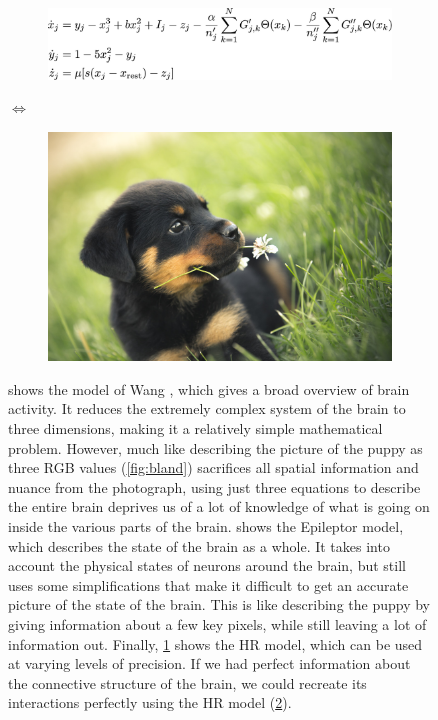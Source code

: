 \begin{figure}[ht]
  \begin{subfigure}[c]{0.4\textwidth}
    \includegraphics[width=\textwidth]{figure/HR}
    \caption{}
    \label{fig:HR}
  \end{subfigure} $\iff$
  \begin{subfigure}[c]{0.4\textwidth}
    \includegraphics[width=\textwidth]{figure/puppy}
    \caption{}
    \label{fig:puppy}
  \end{subfigure}
  \caption{ shows the model of Wang \etal, which gives a broad overview of brain activity.
  It reduces the extremely complex system of the brain to three dimensions, making it a relatively simple mathematical problem.
  However, much like describing the picture of the puppy as three RGB values (\cref{fig:bland}) sacrifices all spatial information and nuance from the photograph, using just three equations to describe the entire brain deprives us of a lot of knowledge of what is going on inside the various parts of the brain.
   shows the Epileptor model, which describes the state of the brain as a whole.
  It takes into account the physical states of neurons around the brain, but still uses some simplifications that make it difficult to get an accurate picture of the state of the brain.
  This is like describing the puppy by giving information about a few key pixels, while still leaving a lot of information out.
  Finally, \cref{fig:HR} shows the HR model, which can be used at varying levels of precision.
  If we had perfect information about the connective structure of the brain, we could recreate its interactions perfectly using the HR model (\cref{fig:puppy}).
}
  \label{fig:analogy}
\end{figure}

